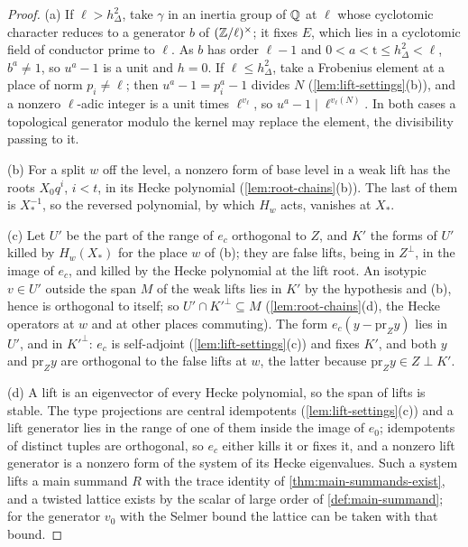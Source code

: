 \begin{proof}
(a) If $\ell>h_\Delta^2$, take $\gamma$ in an inertia group of $\mathbb{Q}$ at $\ell$ whose cyclotomic character reduces to a generator $b$ of $(\mathbb{Z}/\ell)^\times$; it fixes $E$, which lies in a cyclotomic field of conductor prime to $\ell$. As $b$ has order $\ell-1$ and
$0<a<\mathrm t\le h_\Delta^2<\ell$, $b^a\ne1$, so $u^a-1$ is a unit and $h=0$. If $\ell\le h_\Delta^2$, take a Frobenius element at a place of norm $p_i\ne\ell$; then $u^a-1=p_i^a-1$ divides $N$ (\cref{lem:lift-settings}(b)), and a nonzero $\ell$-adic
integer is a unit times $\ell^{v_\ell}$, so $u^a-1\mid\ell^{v_\ell(N)}$. In both cases a topological generator modulo the kernel may replace the element, the divisibility passing to it.

(b) For a split $w$ off the level, a nonzero form of base level in a weak lift has the roots $X_0q^i$, $i<t$, in its Hecke polynomial (\cref{lem:root-chains}(b)). The last of them is $X_*^{-1}$, so the reversed polynomial, by which $H_w$ acts, vanishes at $X_*$.

(c) Let $U'$ be the part of the range of $e_c$ orthogonal to $Z$, and $K'$ the forms of $U'$ killed by $H_w(X_*)$ for the place $w$ of (b); they are false lifts, being in $Z^\perp$, in the image of $e_c$, and killed by the Hecke polynomial at the lift
root. An isotypic $v\in U'$ outside the span $M$ of the weak lifts lies in $K'$ by the hypothesis and (b), hence is orthogonal to itself; so $U'\cap K'^\perp\subseteq M$ (\cref{lem:root-chains}(d), the Hecke operators at $w$ and at other places
commuting). The form $e_c(y-\mathrm{pr}_Zy)$ lies in $U'$, and in $K'^\perp$: $e_c$ is self-adjoint (\cref{lem:lift-settings}(c)) and fixes $K'$, and both $y$ and $\mathrm{pr}_Zy$ are orthogonal to the false lifts at $w$, the latter because $\mathrm{pr}_Zy\in Z\perp K'$.

(d) A lift is an eigenvector of every Hecke polynomial, so the span of lifts is stable. The type projections are central idempotents (\cref{lem:lift-settings}(c)) and a lift generator lies in the range of one of them inside the image of
$e_0$; idempotents of distinct tuples are orthogonal, so $e_c$ either kills it or fixes it, and a nonzero lift generator is a nonzero form of the system of its Hecke eigenvalues. Such a system lifts a main summand $R$ with the trace
identity of \cref{thm:main-summands-exist}, and a twisted lattice exists by the scalar of large order of \cref{def:main-summand}; for the generator $v_0$ with the Selmer bound the lattice can be taken with that bound.
\end{proof}


